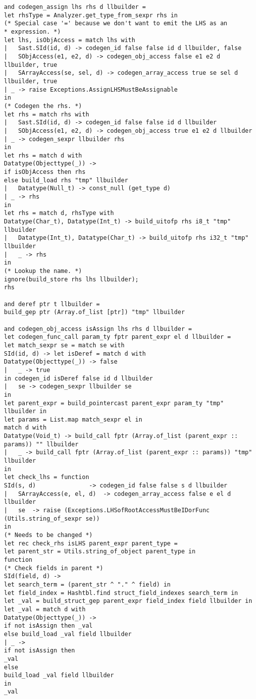 \begin{verbatim}
and codegen_assign lhs rhs d llbuilder = 
let rhsType = Analyzer.get_type_from_sexpr rhs in
(* Special case '=' because we don't want to emit the LHS as an
* expression. *)
let lhs, isObjAccess = match lhs with
| 	Sast.SId(id, d) -> codegen_id false false id d llbuilder, false
|  	SObjAccess(e1, e2, d) -> codegen_obj_access false e1 e2 d llbuilder, true
| 	SArrayAccess(se, sel, d) -> codegen_array_access true se sel d llbuilder, true
| _ -> raise Exceptions.AssignLHSMustBeAssignable
in
(* Codegen the rhs. *)
let rhs = match rhs with 
| 	Sast.SId(id, d) -> codegen_id false false id d llbuilder
|  	SObjAccess(e1, e2, d) -> codegen_obj_access true e1 e2 d llbuilder
| _ -> codegen_sexpr llbuilder rhs 
in
let rhs = match d with 
Datatype(Objecttype(_))	-> 
if isObjAccess then rhs
else build_load rhs "tmp" llbuilder
| 	Datatype(Null_t) -> const_null (get_type d)
| _ -> rhs 
in
let rhs = match d, rhsType with
Datatype(Char_t), Datatype(Int_t) -> build_uitofp rhs i8_t "tmp" llbuilder
| 	Datatype(Int_t), Datatype(Char_t) -> build_uitofp rhs i32_t "tmp" llbuilder
| 	_ -> rhs
in 
(* Lookup the name. *)
ignore(build_store rhs lhs llbuilder);
rhs

and deref ptr t llbuilder = 
build_gep ptr (Array.of_list [ptr]) "tmp" llbuilder

and codegen_obj_access isAssign lhs rhs d llbuilder = 
let codegen_func_call param_ty fptr parent_expr el d llbuilder = 
let match_sexpr se = match se with
SId(id, d) -> let isDeref = match d with
Datatype(Objecttype(_)) -> false
| 	_ -> true 
in codegen_id isDeref false id d llbuilder
| 	se -> codegen_sexpr llbuilder se
in
let parent_expr = build_pointercast parent_expr param_ty "tmp" llbuilder in
let params = List.map match_sexpr el in
match d with
Datatype(Void_t) -> build_call fptr (Array.of_list (parent_expr :: params)) "" llbuilder
| 	_ -> build_call fptr (Array.of_list (parent_expr :: params)) "tmp" llbuilder
in
let check_lhs = function
SId(s, d)				-> codegen_id false false s d llbuilder
| 	SArrayAccess(e, el, d)	-> codegen_array_access false e el d llbuilder
| 	se 	-> raise (Exceptions.LHSofRootAccessMustBeIDorFunc (Utils.string_of_sexpr se))
in
(* Needs to be changed *)
let rec check_rhs isLHS parent_expr parent_type = 
let parent_str = Utils.string_of_object parent_type in
function
(* Check fields in parent *)
SId(field, d) -> 
let search_term = (parent_str ^ "." ^ field) in
let field_index = Hashtbl.find struct_field_indexes search_term in
let _val = build_struct_gep parent_expr field_index field llbuilder in
let _val = match d with 
Datatype(Objecttype(_)) -> 
if not isAssign then _val
else build_load _val field llbuilder
| _ ->
if not isAssign then
_val
else
build_load _val field llbuilder
in
_val


\end{verbatim}
